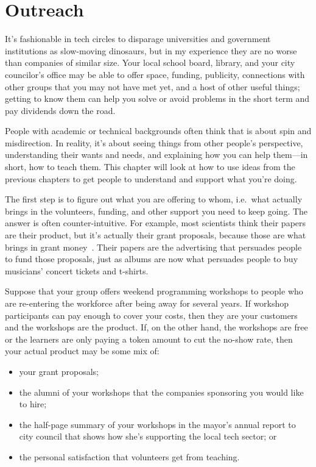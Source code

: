 \chapter{Outreach}\label{s:outreach}

It's fashionable in tech circles
to disparage universities and government institutions as slow-moving dinosaurs,
but in my experience they are no worse than companies of similar size.
Your local school board, library, and your city councilor's office
may be able to offer space, funding, publicity,
connections with other groups that you may not have met yet,
and a host of other useful things;
getting to know them can help you solve or avoid problems in the short term
and pay dividends down the road.


People with academic or technical backgrounds often think that
 is about spin and misdirection.
In reality,
it's about seeing things from other people's perspective,
understanding their wants and needs,
and explaining how you can help them---in short,
how to teach them.
This chapter will look at how to use ideas from the previous chapters
to get people to understand and support what you're doing.

The first step is to figure out what you are offering to whom,
i.e.\ what actually brings in the volunteers,
funding,
and other support you need to keep going.
The answer is often counter-intuitive.
For example,
most scientists think their papers are their product,
but it's actually their grant proposals,
because those are what brings in grant money~\cite{Kuch2011}.
Their papers are the advertising that persuades people to fund those proposals,
just as albums are now what persuades people to buy musicians' concert tickets and t-shirts.

Suppose that your group offers weekend programming workshops
to people who are re-entering the workforce after being away for several years.
If workshop participants can pay enough to cover your costs,
then they are your customers and the workshops are the product.
If,
on the other hand,
the workshops are free or the learners are only paying a token amount to cut the no-show rate,
then your actual product may be some mix of:

\begin{itemize}

\item
  your grant proposals;

\item
  the alumni of your workshops
  that the companies sponsoring you would like to hire;

\item
  the half-page summary of your workshops in the mayor's annual report to city council
  that shows how she's supporting the local tech sector;
  or

\item
  the personal satisfaction that volunteers get from teaching.

\end{itemize}

